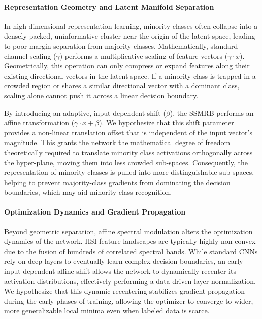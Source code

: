 \documentclass[pdflatex,sn-mathphys-num]{sn-jnl}
\theoremstyle{thmstyleone}
\theoremstyle{thmstyletwo}
\theoremstyle{thmstylethree}
\begin{document}
\paragraph{Representation Geometry and Latent Manifold Separation}
In high-dimensional representation learning, minority classes often collapse into a densely packed, uninformative cluster near the origin of the latent space, leading to poor margin separation from majority classes. Mathematically, standard channel scaling ($\gamma$) performs a multiplicative scaling of feature vectors ($\gamma \cdot x$). Geometrically, this operation can only compress or expand features along their existing directional vectors in the latent space. If a minority class is trapped in a crowded region or shares a similar directional vector with a dominant class, scaling alone cannot push it across a linear decision boundary. 

By introducing an adaptive, input-dependent shift ($\beta$), the SSMRB performs an affine transformation ($\gamma \cdot x + \beta$). We hypothesize that this shift parameter provides a non-linear translation offset that is independent of the input vector's magnitude. This grants the network the mathematical degree of freedom theoretically required to translate minority class activations orthogonally across the hyper-plane, moving them into less crowded sub-spaces. Consequently, the representation of minority classes is pulled into more distinguishable sub-spaces, helping to prevent majority-class gradients from dominating the decision boundaries, which may aid minority class recognition.

\paragraph{Optimization Dynamics and Gradient Propagation}
Beyond geometric separation, affine spectral modulation alters the optimization dynamics of the network. HSI feature landscapes are typically highly non-convex due to the fusion of hundreds of correlated spectral bands. While standard CNNs rely on deep layers to eventually learn complex decision boundaries, an early input-dependent affine shift allows the network to dynamically recenter its activation distributions, effectively performing a data-driven layer normalization. We hypothesize that this dynamic recentering stabilizes gradient propagation during the early phases of training, allowing the optimizer to converge to wider, more generalizable local minima even when labeled data is scarce.
\end{document}
